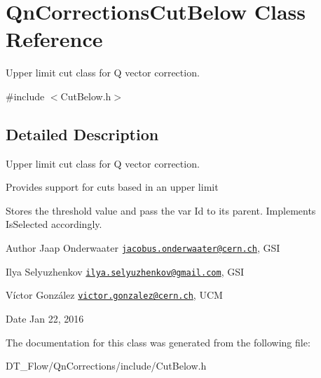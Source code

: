 \hypertarget{classQnCorrectionsCutBelow}{}\section{Qn\+Corrections\+Cut\+Below Class Reference}
\label{classQnCorrectionsCutBelow}


Upper limit cut class for Q vector correction.  




{\ttfamily \#include $<$Cut\+Below.\+h$>$}



\subsection{Detailed Description}
Upper limit cut class for Q vector correction. 

Provides support for cuts based in an upper limit

Stores the threshold value and pass the var Id to its parent. Implements Is\+Selected accordingly.

\begin{DoxyAuthor}{Author}
Jaap Onderwaater \href{mailto:jacobus.onderwaater@cern.ch}{\tt jacobus.\+onderwaater@cern.\+ch}, G\+SI 

Ilya Selyuzhenkov \href{mailto:ilya.selyuzhenkov@gmail.com}{\tt ilya.\+selyuzhenkov@gmail.\+com}, G\+SI 

Víctor González \href{mailto:victor.gonzalez@cern.ch}{\tt victor.\+gonzalez@cern.\+ch}, U\+CM 
\end{DoxyAuthor}
\begin{DoxyDate}{Date}
Jan 22, 2016 
\end{DoxyDate}


The documentation for this class was generated from the following file\+:\begin{DoxyCompactItemize}
\item 
D\+T\+\_\+\+Flow/\+Qn\+Corrections/include/Cut\+Below.\+h\end{DoxyCompactItemize}
